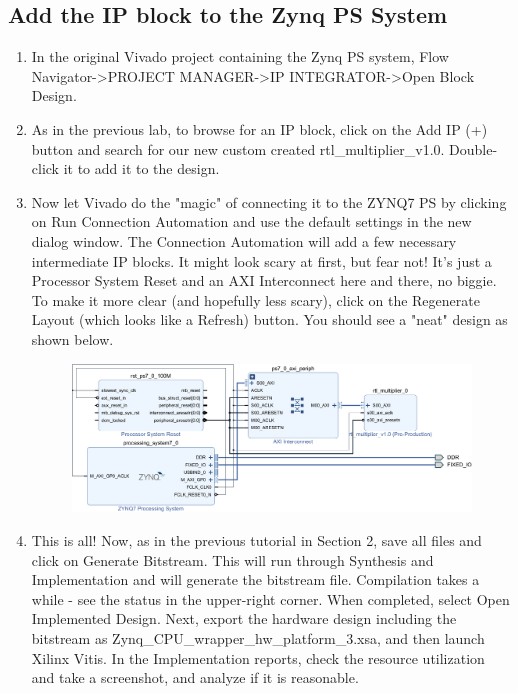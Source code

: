\documentclass[a4paper,12pt,twoside]{article}
\begin{document}
\subsection{Add the IP block to the Zynq PS System}
\begin{enumerate}
    \item In the original Vivado project containing the Zynq PS system, Flow Navigator->PROJECT MANAGER->IP INTEGRATOR->Open Block Design.
    \item As in the previous lab, to browse for an IP block, click on the Add IP (+) button and search for our new custom created rtl\_multiplier\_v1.0. Double-click it to add it to the design.
    \item Now let Vivado do the "magic" of connecting it to the ZYNQ7 PS by clicking on Run Connection Automation and use the default settings in the new dialog window. The Connection Automation will add a few necessary intermediate IP blocks. It might look scary at first, but fear not! It's just a Processor System Reset and an AXI Interconnect here and there, no biggie. To make it more clear (and hopefully less scary), click on the Regenerate Layout (which looks like a Refresh) button. You should see a "neat" design as shown below.
    \begin{figure}[H]
        \centering
        \includegraphics[width=\textwidth]{images/26.png}
    \end{figure}
    \item This is all! Now, as in the previous tutorial in Section 2, save all files and click on Generate Bitstream. This will run through Synthesis and Implementation and will generate the bitstream file. Compilation takes a while - see the status in the upper-right corner. When completed, select Open Implemented Design. Next, export the hardware design including the bitstream as Zynq\_CPU\_wrapper\_hw\_platform\_3.xsa, and then launch Xilinx Vitis. In the Implementation reports, check the resource utilization and take a screenshot, and analyze if it is reasonable.
\end{enumerate}
\inputminted[breaklines,breakanywhere,linenos]{tcl}{lab1_3.tcl}
\end{document}
